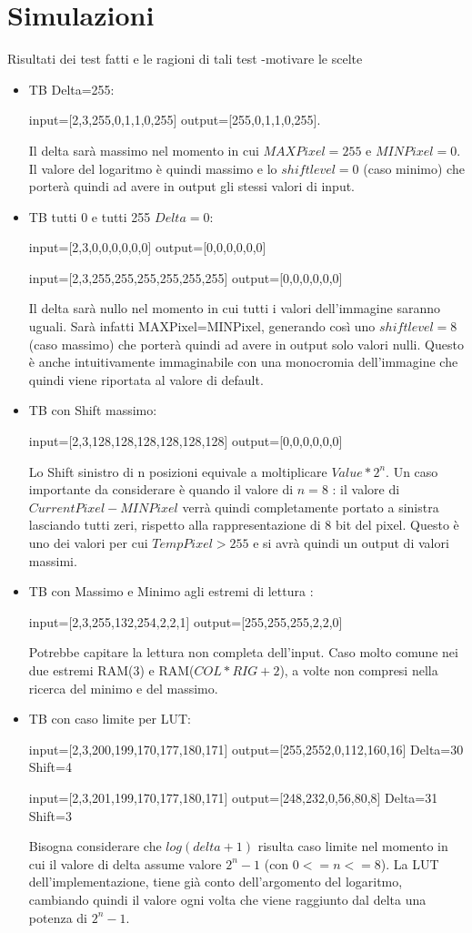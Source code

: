 \documentclass{article}
\begin{document}
\section{Simulazioni}
\label{main-text}
Risultati  dei  test  fatti  e  le ragioni di tali test -motivare le scelte
\begin{itemize}
\item TB Delta=255:

 input=[2,3,255,0,1,1,0,255]
 output=[255,0,1,1,0,255].    
    
   Il delta sarà massimo nel momento in cui \(MAXPixel = 255\) e \(MINPixel = 0\). Il valore del logaritmo è quindi massimo e lo \(shiftlevel=0\) (caso minimo) che porterà quindi ad avere in output gli stessi valori di input.
\item TB tutti 0 e tutti 255 \(Delta=0\):

 input=[2,3,0,0,0,0,0,0] 
 output=[0,0,0,0,0,0]
 
  input=[2,3,255,255,255,255,255,255] 
 output=[0,0,0,0,0,0]
 
 Il delta sarà nullo nel momento in cui tutti i valori dell'immagine saranno uguali. Sarà infatti MAXPixel=MINPixel, generando così uno \(shiftlevel=8\) (caso massimo) che porterà quindi ad avere in output solo valori nulli. Questo è anche intuitivamente immaginabile con una monocromia dell'immagine che quindi viene riportata al valore di default.
 \item TB con Shift massimo:
 
 input=[2,3,128,128,128,128,128,128] 
 output=[0,0,0,0,0,0]

Lo Shift sinistro di n posizioni equivale a moltiplicare \(Value*2^{n}\). Un caso importante da considerare è quando il valore di \(n=8\) : il valore di \(Current Pixel-MINPixel\) verrà quindi completamente portato a sinistra lasciando tutti zeri, rispetto alla rappresentazione di 8 bit del pixel. Questo è uno dei valori per cui \(Temp Pixel>255\) e si avrà quindi un output di valori massimi.
\item TB con Massimo e Minimo agli estremi di lettura : 
 
 input=[2,3,255,132,254,2,2,1] 
 output=[255,255,255,2,2,0]
 
 Potrebbe capitare la lettura non completa dell'input. Caso molto comune nei due estremi RAM(3) e RAM(\(COL*RIG+2\)), a volte non compresi nella ricerca del minimo e del massimo.
 
 \item TB con caso limite per LUT: 
 
  input=[2,3,200,199,170,177,180,171] 
 output=[255,2552,0,112,160,16]
 Delta=30 Shift=4
 
 input=[2,3,201,199,170,177,180,171] 
 output=[248,232,0,56,80,8]
 Delta=31 Shift=3
 
  Bisogna considerare che \(log (delta +1)\) risulta caso limite nel momento in cui il valore di delta assume valore \(2^{n}-1\) (con \(0<=n<=8\)). La LUT dell'implementazione, tiene già conto dell'argomento del logaritmo, cambiando quindi il valore ogni volta che viene raggiunto dal delta una potenza di \(2^{n}-1\).  
\end{itemize}
\end{document}
